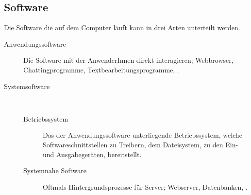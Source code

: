 \documentclass{article}
\begin{document}
\subsection{Software}
Die Software die auf dem Computer läuft kann in drei Arten unterteilt werden.
\begin{description}
 \item[Anwendungssoftware] Die Software mit der AnwenderInnen direkt interagieren; Webbrowser, Chattingprogramme, Textbearbeitungsprogramme, \etc.
 \item[Systemsoftware]~ 
 \begin{description}
  \item[Betriebssystem] Das der Anwendungssoftware unterliegende Betriebssystem, welche Softwareschnittstellen zu Treibern, dem Dateisystem, zu den Ein- und Ausgabegeräten, \etc bereitstellt.
  \item[Systemnahe Software] Oftmals Hintergrundsprozesse für Server; Webserver, Datenbanken, \etc.
 \end{description}
\end{description}
\end{document}
